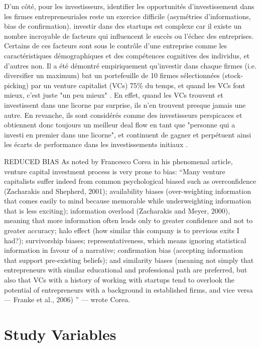 \documentclass[12pt]{article}
\begin{document}
D'un côté, pour les investisseurs, identifier les opportunités d'investissement dans les firmes entrepreneuriales reste un exercice difficile (asymétries d'informations, bias de confirmation). investir dans des startups est complexe car il existe un nombre incroyable de facteurs qui influencent le succès ou l'échec des entreprises. Certains de ces facteurs sont sous le contrôle d'une entreprise comme les caractéristiques démographiques et des compétences cognitives des individus, et d'autres non. Il a été démontré empiriquement qu'investir dans chaque firmes (i.e. diversifier un maximum) bat un portefeuille de 10 firmes sélectionnées (stock-picking) par un venture capitalist (VCs) 75\% du temps, et quand les VCs font mieux, c'est juste "un peu mieux" \citep{othman2020angelistdata}. En effet, quand les VCs trouvent et investissent dans une licorne par surprise, ils n'en trouvent presque jamais une autre. En revanche, ils sont considérés comme des investisseurs perspicaces et obtiennent donc toujours un meilleur deal flow en tant que "personne qui a investi en premier dans une licorne", et continuent de gagner et perpétuent ainsi les écarts de performance dans les investissements initiaux \citep{nanda2020persistent}.


REDUCED BIAS
As noted by Francesco Corea in his phenomenal article, venture capital investment process is very prone to bias:
“Many venture capitalists suffer indeed from common psychological biased such as overconfidence (Zacharakis and Shepherd, 2001); availability biases (over-weighting information that comes easily to mind because memorable while underweighting information that is less exciting); information overload (Zacharakis and Meyer, 2000), meaning that more information often leads only to greater confidence and not to greater accuracy; halo effect (how similar this company is to previous exits I had?); survivorship biases; representativeness, which means ignoring statistical information in favour of a narrative; confirmation bias (accepting information that support pre-existing beliefs); and similarity biases (meaning not simply that entrepreneurs with similar educational and professional path are preferred, but also that VCs with a history of working with startups tend to overlook the potential of entrepreneurs with a background in established firms, and vice versa — Franke et al., 2006) ” — wrote Corea.

\section{Study Variables}
\end{document}
